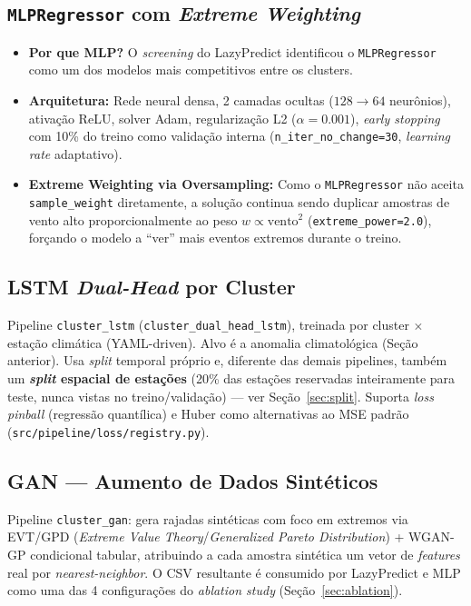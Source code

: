 \documentclass[11pt,a4paper]{article}
\begin{document}
\subsection{\texttt{MLPRegressor} com \textit{Extreme Weighting}}
\begin{itemize}
    \item \textbf{Por que MLP?} O \textit{screening} do LazyPredict identificou o \texttt{MLPRegressor} como um dos modelos mais competitivos entre os clusters.
    \item \textbf{Arquitetura:} Rede neural densa, 2 camadas ocultas ($128 \rightarrow 64$ neurônios), ativação ReLU, solver Adam, regularização L2 ($\alpha=0.001$), \textit{early stopping} com 10\% do treino como validação interna (\texttt{n\_iter\_no\_change=30}, \textit{learning rate} adaptativo).
    \item \textbf{Extreme Weighting via Oversampling:} Como o \texttt{MLPRegressor} não aceita \texttt{sample\_weight} diretamente, a solução continua sendo duplicar amostras de vento alto proporcionalmente ao peso $w \propto \text{vento}^2$ (\texttt{extreme\_power=2.0}), forçando o modelo a ``ver'' mais eventos extremos durante o treino.
\end{itemize}

\subsection{LSTM \textit{Dual-Head} por Cluster}
Pipeline \texttt{cluster\_lstm} (\texttt{cluster\_dual\_head\_lstm}), treinada por cluster $\times$ estação climática (YAML-driven). Alvo é a anomalia climatológica (Seção anterior). Usa \textit{split} temporal próprio e, diferente das demais pipelines, também um \textbf{\textit{split} espacial de estações} (20\% das estações reservadas inteiramente para teste, nunca vistas no treino/validação) --- ver Seção~\ref{sec:split}. Suporta \textit{loss} \textit{pinball} (regressão quantílica) e Huber como alternativas ao MSE padrão (\texttt{src/pipeline/loss/registry.py}).

\subsection{GAN --- Aumento de Dados Sintéticos}
Pipeline \texttt{cluster\_gan}: gera rajadas sintéticas com foco em extremos via EVT/GPD (\textit{Extreme Value Theory}/\textit{Generalized Pareto Distribution}) + WGAN-GP condicional tabular, atribuindo a cada amostra sintética um vetor de \textit{features} real por \textit{nearest-neighbor}. O CSV resultante é consumido por LazyPredict e MLP como uma das 4 configurações do \textit{ablation study} (Seção~\ref{sec:ablation}).
\end{document}
